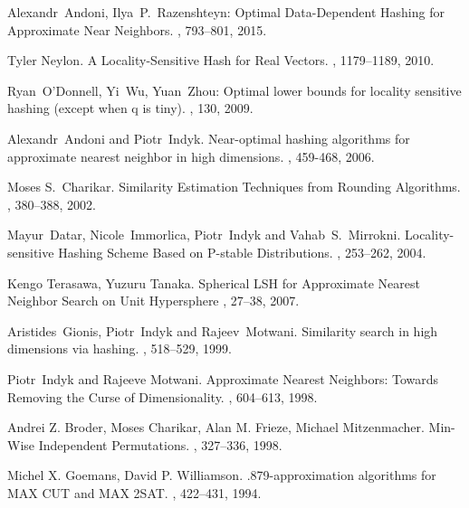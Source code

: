 \documentclass[11pt]{article}
\begin{document}


\begin{thebibliography}{42}


Alexandr~Andoni, Ilya~P.~Razenshteyn:
\newblock Optimal Data-Dependent Hashing for Approximate Near Neighbors. 
, 793--801, 2015.

Tyler Neylon.
\newblock A Locality-Sensitive Hash for Real Vectors. 
, 1179--1189, 2010.

Ryan~O'Donnell, Yi~Wu, Yuan~Zhou:
\newblock Optimal lower bounds for locality sensitive hashing (except when q is tiny). 
, 130, 2009.

Alexandr~Andoni and Piotr~Indyk.
\newblock Near-optimal hashing algorithms for approximate nearest neighbor in high dimensions.
, 459-468, 2006.

Moses S.~Charikar.
\newblock Similarity Estimation Techniques from Rounding Algorithms.
, 380--388, 2002.

Mayur~Datar, Nicole~Immorlica, Piotr~Indyk and Vahab~S.~Mirrokni.
\newblock Locality-sensitive Hashing Scheme Based on P-stable Distributions.
, 253--262, 2004.

Kengo Terasawa, Yuzuru Tanaka.
\newblock Spherical LSH for Approximate Nearest Neighbor Search on Unit Hypersphere
, 27--38, 2007.

Aristides~Gionis, Piotr~Indyk and Rajeev~Motwani.
\newblock Similarity search in high dimensions via hashing.
, 518--529, 1999.

Piotr~Indyk and Rajeeve Motwani.
\newblock Approximate Nearest Neighbors: Towards Removing the Curse of Dimensionality.
, 604--613, 1998.

Andrei Z. Broder, Moses Charikar, Alan M. Frieze, Michael Mitzenmacher.
\newblock Min-Wise Independent Permutations. 
, 327--336, 1998.

Michel X. Goemans, David P. Williamson.
\newblock .879-approximation algorithms for MAX CUT and MAX 2SAT. 
, 422--431, 1994.

\end{thebibliography}
\end{document}
